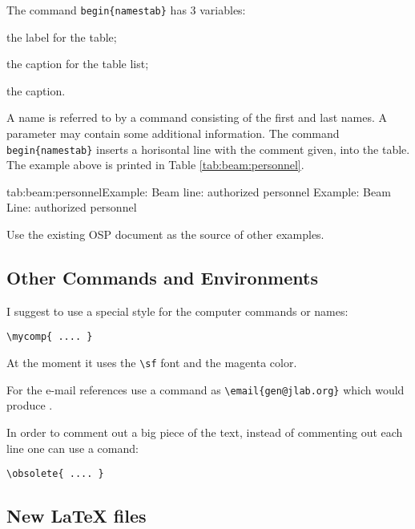 \documentclass[12pt,letterpaper]{article}
\begin{document}
The command {{\color{blue}\verb|begin{namestab}|}} has 3 variables:
\begin{list}{.~}{\setlength{\itemsep}{-0.15cm}}
  \item the label for the table; 
  \item the caption for the table list;
  \item the caption.
\end{list}
A name is referred to by a command consisting of the first and last names.
A parameter may contain some additional information. The command
{{\color{blue}\verb|begin{namestab}|}} inserts a horisontal line 
with the comment given, into the table. The example above
is printed in Table \ref{tab:beam:personnel}.
\begin{namestab}{tab:beam:personnel}{Example: Beam line: authorized personnel}{%
   Example: Beam Line: authorized personnel}
\end{namestab}

Use the existing OSP document as the source of other examples.

\subsection{Other Commands and Environments}
\label{sec:otherenv}

  I suggest to use a special style for the computer
  commands or names:
  {\color{blue}
   \begin{verbatim}
\mycomp{ .... }
  \end{verbatim}%
  }\noindent
  At the moment it uses the {\color{blue}\verb|\sf|} font
  and the magenta color.

  For the e-mail references use a command as {\color{blue}\verb|\email{gen@jlab.org}|}
  which would produce .

  In order to comment out a big piece of the text, instead
  of commenting out each line one can use 
  a comand:
  {\color{blue}
   \begin{verbatim}
\obsolete{ .... }
  \end{verbatim}%
  }\noindent

\subsection{New \LaTeX{} files}
\label{sec:newlatex}
\end{document}
